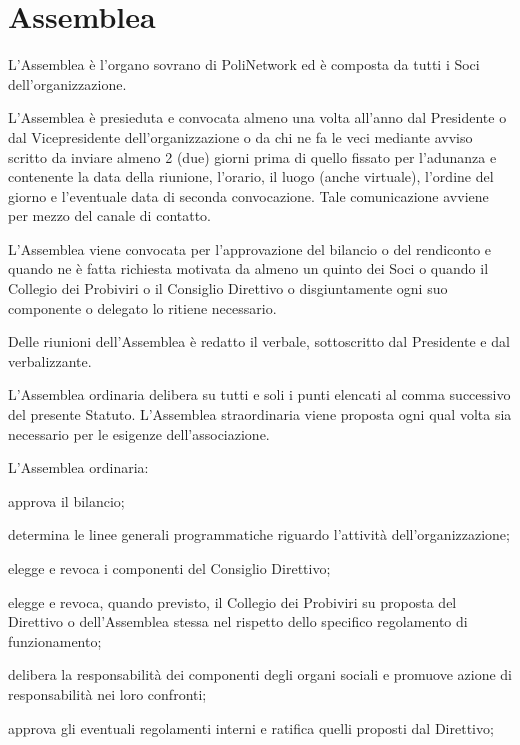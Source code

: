 \documentclass[legalpaper, 11pt]{exam}
\let\tempone\enumerate
\let\temptwo\endenumerate
\renewenvironment{enumerate}{\tempone\addtolength{\itemsep}{-0.45\baselineskip}}{\temptwo}
\begin{document}
{\section{Assemblea}
\begin{enumerate}
 \item L’Assemblea è l’organo sovrano di PoliNetwork ed è composta da tutti i Soci dell’organizzazione.
 \item L’Assemblea è presieduta e convocata almeno una volta all’anno dal Presidente o dal Vicepresidente dell’organizzazione o da chi ne fa le veci mediante avviso scritto da inviare almeno 2 (due) giorni prima di quello fissato per l’adunanza e contenente la data della riunione, l’orario, il luogo (anche virtuale), l’ordine del giorno e l’eventuale data di seconda convocazione. Tale comunicazione avviene per mezzo del canale di contatto.
 \item L’Assemblea viene convocata per l’approvazione del bilancio o del rendiconto e quando ne è fatta richiesta motivata da almeno un quinto dei Soci o quando il Collegio dei Probiviri o il Consiglio Direttivo o disgiuntamente ogni suo componente o delegato lo ritiene necessario.
 \item Delle riunioni dell’Assemblea è redatto il verbale, sottoscritto dal Presidente e dal verbalizzante.
 \item L’Assemblea ordinaria delibera su tutti e soli i punti elencati al comma successivo del presente Statuto. L’Assemblea straordinaria viene proposta ogni qual volta sia necessario per le esigenze dell’associazione.
 \item L'Assemblea ordinaria:
 \vspace{-5pt}
 \begin{enumerate}
  \item approva il bilancio;
  \item determina le linee generali programmatiche riguardo l’attività dell’organizzazione;
  \item elegge e revoca i componenti del Consiglio Direttivo;
  \item elegge e revoca, quando previsto, il Collegio dei Probiviri su proposta del Direttivo o dell’Assemblea stessa nel rispetto dello specifico regolamento di funzionamento;
  \item delibera la responsabilità dei componenti degli organi sociali e promuove azione di responsabilità nei loro confronti;
  \item approva gli eventuali regolamenti interni e ratifica quelli proposti dal Direttivo;

\end{enumerate}
\end{enumerate}}
\end{document}

